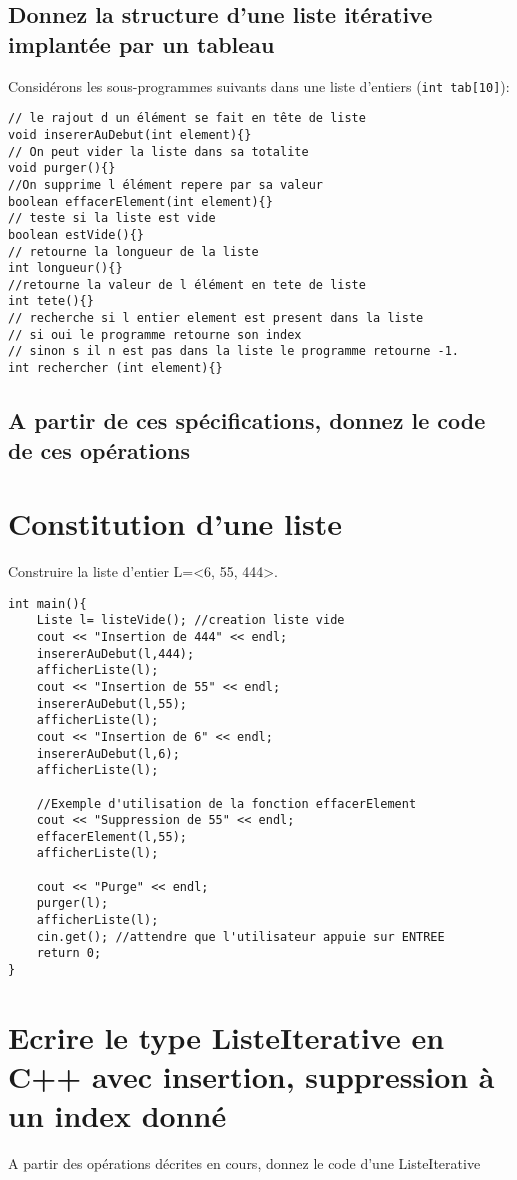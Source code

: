 \documentclass[french]{article}
\begin{document}
	\subsection{Donnez la structure d’une liste itérative implantée par un tableau}
	Considérons les sous-programmes suivants dans une liste d’entiers (\texttt{int tab[10]}):
\begin{lstlisting}[caption={Liste des opérations dans une liste d’entiers}]
// le rajout d un élément se fait en tête de liste
void insererAuDebut(int element){} 
// On peut vider la liste dans sa totalite
void purger(){} 
//On supprime l élément repere par sa valeur
boolean effacerElement(int element){}
// teste si la liste est vide
boolean estVide(){} 
// retourne la longueur de la liste
int longueur(){}
//retourne la valeur de l élément en tete de liste
int tete(){}
// recherche si l entier element est present dans la liste 
// si oui le programme retourne son index 
// sinon s il n est pas dans la liste le programme retourne -1.
int rechercher (int element){}  
\end{lstlisting}
	
	
	\subsection{A partir de ces spécifications, donnez le code de ces opérations}

	\section{Constitution d’une liste}
	Construire la liste d’entier L=<6, 55, 444>.
	
	\begin{lstlisting}
int main(){
    Liste l= listeVide(); //creation liste vide
    cout << "Insertion de 444" << endl;
    insererAuDebut(l,444);
    afficherListe(l);
    cout << "Insertion de 55" << endl;
    insererAuDebut(l,55);
    afficherListe(l);
    cout << "Insertion de 6" << endl;
    insererAuDebut(l,6);
    afficherListe(l);
	
    //Exemple d'utilisation de la fonction effacerElement
    cout << "Suppression de 55" << endl;
    effacerElement(l,55);
    afficherListe(l);
    
    cout << "Purge" << endl;
    purger(l);
    afficherListe(l);
    cin.get(); //attendre que l'utilisateur appuie sur ENTREE
    return 0;	 
}
	\end{lstlisting}
	\section{Ecrire le type ListeIterative en C++ avec insertion, suppression à un index donné}
	A partir des opérations décrites en cours, donnez le code d’une ListeIterative
	
\end{document}
